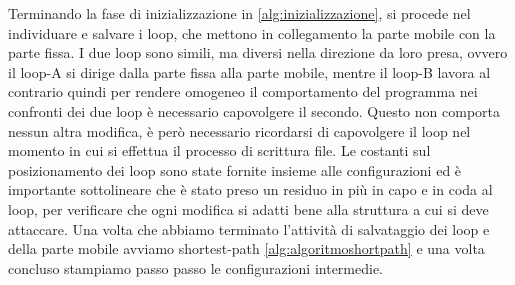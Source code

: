 Terminando la fase di inizializzazione in \ref{alg:inizializzazione}, si procede nel individuare e salvare i loop, che mettono in collegamento la parte mobile con la parte fissa. I due loop sono simili, ma diversi nella direzione da loro presa, ovvero il loop-A si dirige dalla parte fissa alla parte mobile, mentre il loop-B lavora al contrario quindi per rendere omogeneo il comportamento del programma nei confronti dei due loop è necessario capovolgere il secondo. Questo non comporta nessun altra modifica, è però necessario ricordarsi di capovolgere il loop nel momento in cui si effettua il processo di scrittura file. Le costanti sul posizionamento dei loop sono state fornite insieme alle configurazioni ed è importante sottolineare che è stato preso un residuo in più in capo e in coda al loop, per verificare che ogni modifica si adatti bene alla struttura a cui si deve attaccare. Una volta che abbiamo terminato l'attività di salvataggio dei loop e della parte mobile avviamo shortest-path \ref{alg:algoritmoshortpath} e una volta concluso stampiamo passo passo le configurazioni intermedie. 

